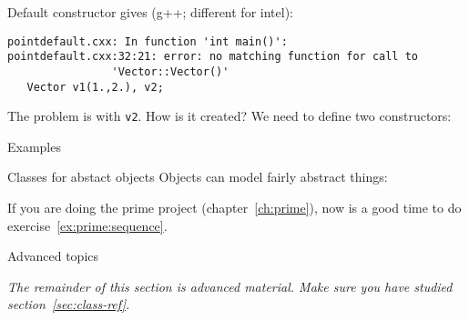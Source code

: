 \begin{slide}{Default constructor}
  \label{sl:obj-def-construct}
\small
  gives (g++; different for intel):
\begin{lstlisting}
pointdefault.cxx: In function 'int main()':
pointdefault.cxx:32:21: error: no matching function for call to
                'Vector::Vector()'
   Vector v1(1.,2.), v2;
\end{lstlisting}
The problem is with \lstinline{v2}. How is it created? We need to define two constructors:
\end{slide}

\begin{comment}
  \Level 1 {Accessors}

  It is a good idea to keep data members private, and use accessor
  functions.

  \begin{exercise}
    \label{ex:geom:twoconstruct}
    Write a \lstinline{Point} class that has two constructors:
    \begin{lstlisting}
      class Point {
        private:
        // data members
        public:
        Point( float x,float y ) { /* ... */ };
        Point( float r,float theta ) { /* ... */ };
        float get_x() { /* ... */ };
        float get_y() { /* ... */ };
        float get_r() { /* ... */ };
        float get_theta() { /* ... */ };
      };
    \end{lstlisting}
    Use $r,\theta$ for the private variables, do not store $x,y$.
  \end{exercise}
\end{comment}

 {Examples}

\begin{block}{Classes for abstact objects}
  \label{sl:intstream}
  Objects can model fairly abstract things:
\end{block}

\begin{exercise}
  If you are doing the prime project (chapter~\ref{ch:prime}),
  now is a good time to do exercise~\ref{ex:prime:sequence}.
\end{exercise}

 {Advanced topics}

\emph{The remainder of this section is advanced material. Make sure
  you have studied section~\ref{sec:class-ref}.}

